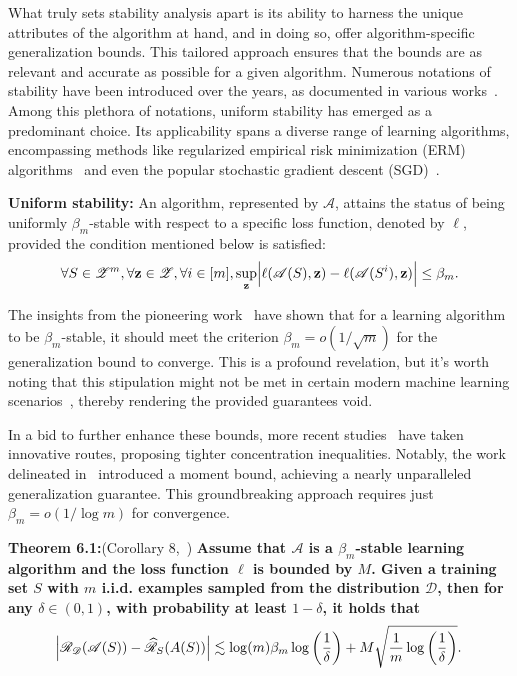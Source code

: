\documentclass[preprint,12pt,authoryear]{elsarticle}
\newcommand{\sA}{{\mathscr A}}
\newcommand{\sD}{{\mathscr D}}
\newcommand{\sR}{{\mathscr R}}
\newcommand{\sZ}{{\mathscr Z}}
\newcommand{\bz}{{\mathbf z}}
\begin{document}
What truly sets stability analysis apart is its ability to harness the unique attributes of the algorithm at hand, and in doing so, offer algorithm-specific generalization bounds. This tailored approach ensures that the bounds are as relevant and accurate as possible for a given algorithm. Numerous notations of stability have been introduced over the years, as documented in various works~\cite{157_theory, 158_theory,159_theory,160_theory}. Among this plethora of notations, uniform stability has emerged as a predominant choice. Its applicability spans a diverse range of learning algorithms, encompassing methods like regularized empirical risk minimization (ERM) algorithms~\cite{157_theory} and even the popular stochastic gradient descent (SGD)~\cite{159_theory,161_theory, 162_theory}.


\textbf{Uniform stability:}
An algorithm, represented by $\sA$, attains the status of being uniformly $\beta_m$-stable with respect to a specific loss function, denoted by $\ell$, provided the condition mentioned below is satisfied:
\begin{equation}
\forall S \in \sZ^m, \forall \bz \in \sZ, \forall i \in [m], \sup_{\bz} \abs{\ell(\sA(S), \bz) - \ell(\sA(S^i), \bz)} \leq \beta_m.
\end{equation}

The insights from the pioneering work~\cite{157_theory} have shown that for a learning algorithm to be $\beta_m$-stable, it should meet the criterion $\beta_m = o(1/\sqrt{m})$ for the generalization bound to converge. This is a profound revelation, but it's worth noting that this stipulation might not be met in certain modern machine learning scenarios~\cite{163_theory}, thereby rendering the provided guarantees void.

In a bid to further enhance these bounds, more recent studies~\cite{164_theory, 165_theory, 166_theory} have taken innovative routes, proposing tighter concentration inequalities. Notably, the work delineated in~\cite{166_theory} introduced a moment bound, achieving a nearly unparalleled generalization guarantee. This groundbreaking approach requires just $\beta_m = o(1 / \log m)$ for convergence.

\textbf{Theorem 6.1:}(Corollary 8,~\cite{166_theory})
\label{thm: classical stability bound}
\textbf{Assume that $\sA$ is a $\beta_m$-stable learning algorithm and the loss function $\ell$ is bounded by $M$. Given a training set $S$ with $m$ i.i.d. examples sampled from the distribution $\sD$, then for any $\delta \in (0,1)$, with probability at least $1-\delta$, it holds that}
\begin{equation}
\abs{\sR_{\sD}(\sA(S)) - \widehat{\sR}_{S}(A(S))} \lesssim \log (m) \beta_m \log \left(\frac{1}{\delta}\right)+ M \sqrt{\frac{1}{m}\log \left(\frac{1}{\delta}\right)}.
\end{equation}
\end{document}
